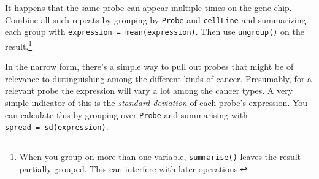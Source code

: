 \documentclass[]{tufte-handout}
\newenvironment{Shaded}{}{}
\newcommand{\KeywordTok}[1]{\textcolor[rgb]{0.00,0.44,0.13}{\textbf{{#1}}}}
\newcommand{\DataTypeTok}[1]{\textcolor[rgb]{0.56,0.13,0.00}{{#1}}}
\newcommand{\DecValTok}[1]{\textcolor[rgb]{0.25,0.63,0.44}{{#1}}}
\newcommand{\FloatTok}[1]{\textcolor[rgb]{0.25,0.63,0.44}{{#1}}}
\newcommand{\StringTok}[1]{\textcolor[rgb]{0.25,0.44,0.63}{{#1}}}
\newcommand{\NormalTok}[1]{{#1}}
\begin{document}
It happens that the same probe can appear multiple times on the gene
chip. Combine all such repeats by grouping by \texttt{Probe} and
\texttt{cellLine} and summarizing each group with
\texttt{expression\ =\ mean(expression)}. Then use \texttt{ungroup()} on
the result.\footnote{When you group on more than one variable,
  \texttt{summarise()} leaves the result partially grouped. This can
  interfere with later operations.}

In the narrow form, there's a simple way to pull out probes that might
be of relevance to distinguishing among the different kinds of cancer.
Presumably, for a relevant probe the expression will vary a lot among
the cancer types. A very simple indicator of this is the \emph{standard
deviation} of each probe's expression. You can calculate this by
grouping over \texttt{Probe} and summarising with
\texttt{spread\ =\ sd(expression)}.

\begin{Shaded}
\end{Shaded}
\end{document}
